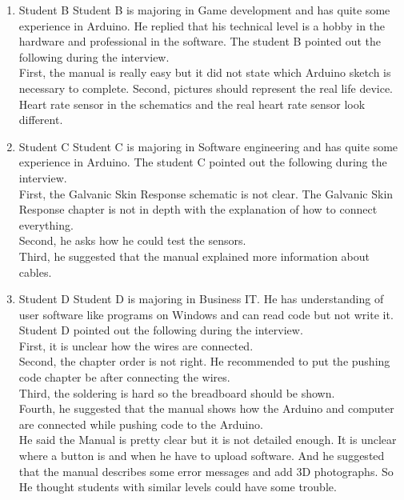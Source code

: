 \documentclass[conference]{IEEEtran}
\begin{document}
\begin{enumerate}
\begin{enumerate}
					\item Student B
					Student B is majoring in Game development and has  quite some experience in Arduino. He replied that his technical level is a hobby in the hardware and professional in the software. The student B pointed out the following during the interview.\\
					First, the manual is really easy but it did not state which Arduino sketch is necessary to complete.
					Second, pictures should represent the real life device. Heart rate sensor in the schematics and the real heart rate sensor look different.\\
					
					\item Student C
					Student C is majoring in Software engineering and has  quite some experience in Arduino. The student C pointed out the following during the interview.\\
					First, the Galvanic Skin Response schematic is not clear. The Galvanic Skin Response chapter is not in depth with the explanation of how to connect everything.\\
					Second, he asks how he could test the sensors.\\
					Third, he suggested that the manual explained more information about cables.\\

					\item Student D
					Student D is majoring in Business IT. He has understanding of user software like programs on Windows and can read code but not write it. Student D pointed out the following during the interview.\\
					First, it is unclear how the wires are connected.\\
					Second, the chapter order is not right. He recommended to put the pushing code chapter be after connecting the wires.\\
					Third, the soldering is hard so the breadboard should be shown.\\
					Fourth, he suggested that the manual shows how the Arduino and computer are connected while pushing code to the Arduino.\\
					He said the Manual is pretty clear but it is not detailed enough. It is unclear where a button is and when he have to upload software. And he suggested that the manual describes some error messages and add 3D photographs. So He thought students with similar levels could have some trouble. 
				\end{enumerate}


\end{enumerate}
\end{document}
